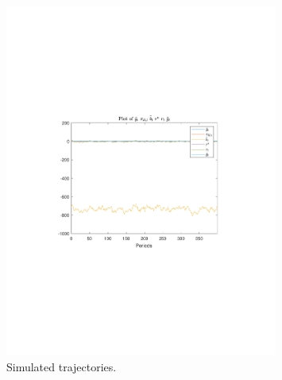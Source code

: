  
\begin{figure}[H]
\centering 
\includegraphics[width=0.80\textwidth]{monetary/graphs/SimulatedTrajectory_y}
\caption{Simulated trajectories.}\label{Fig:SimulatedTrajectory_:y}
\end{figure}

